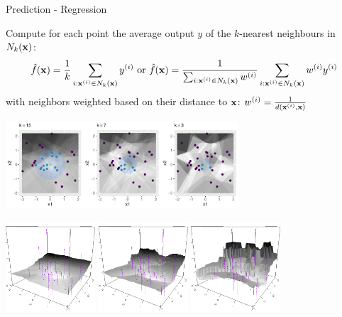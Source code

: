 \documentclass[11pt,compress,t,notes=noshow, xcolor=table]{beamer}
\begin{document}
\begin{vbframe}{Prediction - Regression}
\begin{footnotesize}
Compute for each point the average output $y$ of the $k$-nearest neighbours in $N_k(\mathbf{x})$:
$$
\hat{f}(\mathbf{x}) = \frac{1}{k} \sum_{i: \mathbf{x}^{(i)} \in N_k(\mathbf{x})} y^{(i)} \text  { or }
\hat{f}(\mathbf{x}) = \frac{1}{\sum_{i: \mathbf{x}^{(i)} \in N_k(\mathbf{x})} w^{(i)}} \sum_{i: \mathbf{x}^{(i)} \in N_k(\mathbf{x})} w^{(i)} y^{(i)}
$$
with neighbors weighted based on their distance to $\mathbf{x}$: $w^{(i)} = \frac{1}{d(\mathbf{x}^{(i)}, \mathbf{x})}$
\vspace{-0.3cm}
\begin{center}
\includegraphics[width=0.65\textwidth,keepaspectratio]{figure/reg_knn_contour}

\vspace{-0.1cm}
\includegraphics[width=0.25\textwidth]{figure/knn-reg-3d-15.png}
\includegraphics[width=0.25\textwidth]{figure/knn-reg-3d-7.png}
\includegraphics[width=0.25\textwidth]{figure/knn-reg-3d-3.png}
\end{center}

\end{footnotesize}

\end{vbframe}
\end{document}
